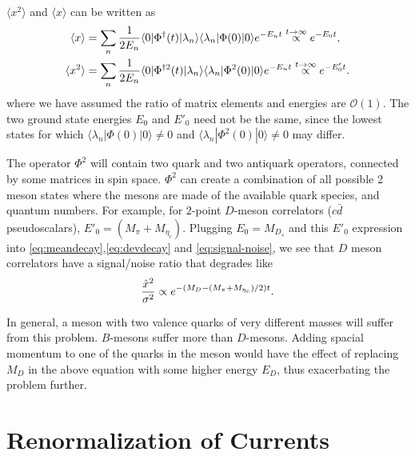 $\langle x^2 \rangle$ and $\langle x \rangle$ can be written as
\begin{align}
  \label{eq:meandecay}
  \langle x \rangle &= \sum_n {1\over 2E_n} \langle 0 | \Phi^{\dagger}(t) | \lambda_n \rangle \langle \lambda_n | \Phi(0) | 0 \rangle e^{-E_n t} \stackrel{t\to\infty}{\propto} e^{-E_0 t}, \\
  \langle x^2 \rangle &= \sum_n {1\over 2E_n} \langle 0 | \Phi^{\dagger 2}(t) | \lambda_n \rangle \langle \lambda_n | \Phi^2(0) | 0 \rangle e^{-E_n t} \stackrel{t\to\infty}{\propto} e^{-E'_0 t}.
  \label{eq:devdecay}
\end{align}
where we have assumed the ratio of matrix elements and energies are $\mathcal{O}(1)$. The two ground state energies $E_0$ and $E'_0$ need not be the same, since the lowest states for which $\langle \lambda_n | \Phi(0) | 0 \rangle \neq 0$ and $\langle \lambda_n | \Phi^2(0) | 0 \rangle \neq 0$ may differ.

The operator $\Phi^2$ will contain two quark and two antiquark operators, connected by some matrices in spin space. $\Phi^2$ can create a combination of all possible 2 meson states where the mesons are made of the available quark species, and quantum numbers. For example, for 2-point $D$-meson correlators ($c\bar{d}$ pseudoscalars), $E'_0 = (M_{\pi}+M_{\eta_c})$. Plugging $E_0=M_{D_s}$ and this $E'_0$ expression into \eqref{eq:meandecay},\eqref{eq:devdecay} and \eqref{eq:signal-noise}, we see that $D$ meson correlators have a signal/noise ratio that degrades like
\begin{align}
  {\hat{x}^2\over \sigma^2} \propto e^{-(M_{D}-(M_{\pi}+M_{\eta_c})/2)t}.
\end{align}

In general, a meson with two valence quarks of very different masses will suffer from this problem. $B$-mesons suffer more than $D$-mesons. Adding spacial momentum to one of the quarks in the meson would have the effect of replacing $M_D$ in the above equation with some higher energy $E_D$, thus exacerbating the problem further.

\section{Renormalization of Currents}
\label{sec:renormalization}

